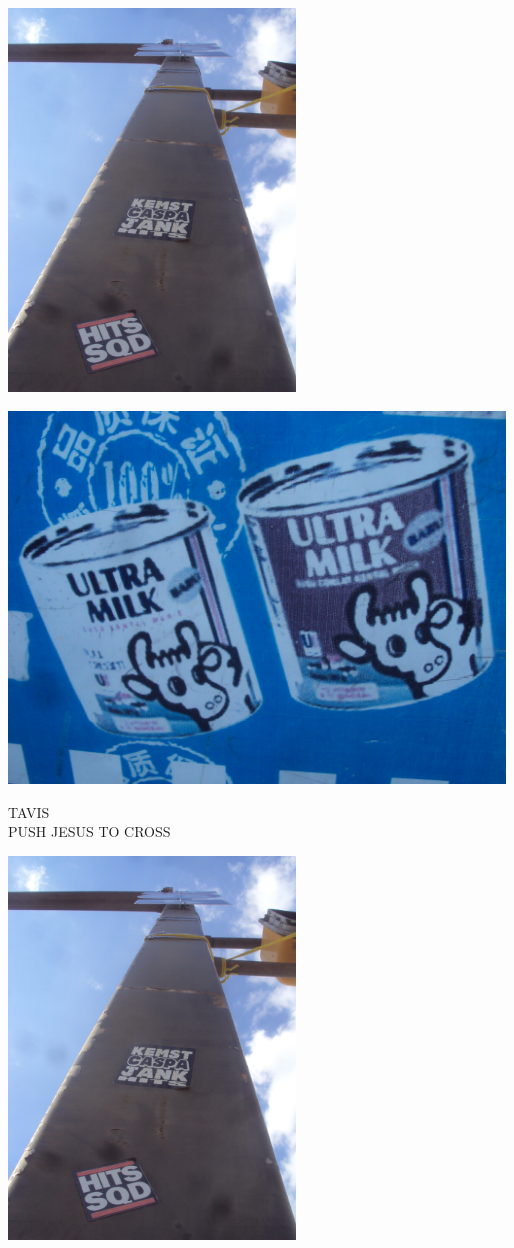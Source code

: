 \documentclass[10pt,letterpaper]{article}
\begin{document}
\includegraphics[height=4in]{portrait.jpg}

\vspace{0.25in}
\includegraphics[width=5.19in]{landscape.jpg}

TAVIS\\
PUSH JESUS TO CROSS\\
\pagebreak

\includegraphics[height=4in]{portrait.jpg}
\end{document}
